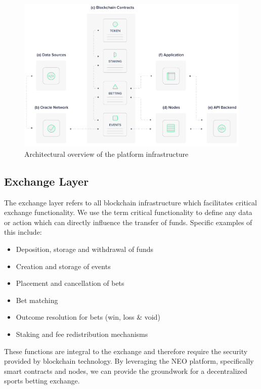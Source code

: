 \documentclass{article}
\begin{document}
\begin{figure}[!htb]
\centering
\includegraphics[scale=.18]{./images/architecture-diagram.png}
\caption{Architectural overview of the platform infrastructure}
\label{figure:architecture}
\end{figure}


	\subsection{Exchange Layer} \label{exchange-layer}

The exchange layer refers to all blockchain infrastructure which facilitates critical exchange functionality. We use the term critical functionality to define any data or action which can directly influence the transfer of funds. Specific examples of this include:

\begin{itemize}
	\item Deposition, storage and withdrawal of funds
	\item Creation and storage of events
	\item Placement and cancellation of bets
	\item Bet matching
	\item Outcome resolution for bets (win, loss \& void)
	\item Staking and fee redistribution mechanisms
\end{itemize}

These functions are integral to the exchange and therefore require the security provided by blockchain technology. By leveraging the NEO platform, specifically smart contracts and nodes, we can provide the groundwork for a decentralized sports betting exchange.
\end{document}
